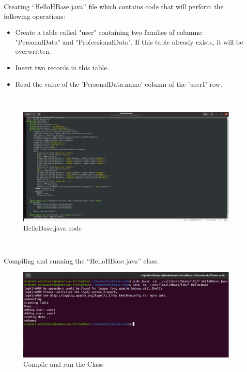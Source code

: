 \begin{spacing}{1.2}
\par Creating “HelloHBase.java” file which contains code that will perform the following operations:
\\
\begin{itemize}
  \item Create a table called "user" containing two families of columns: "PersonalData" and
"ProfessionalData". If this table already exists, it will be overwritten.
  \item Insert two records in this table.
  \item Read the value of the 'PersonalData:name' column of the 'user1' row.
\end{itemize}

\\
\begin{figure}[!htb] 
\begin{center} 
\includegraphics[width=1\linewidth]{Pictures/HBase/Using the HBase Java API/Configure the CLASSPATH in the .bashrc/HelloBase.java code} 
\end{center} 
\caption{HelloBase.java code} 
\end{figure}  \FloatBarrier
\\
\newpage
\par Compiling and running the “HelloHBase.java” class.
\\
\begin{figure}[!htb] 
\begin{center} 
\includegraphics[width=1\linewidth]{Pictures/HBase/Using the HBase Java API/Configure the CLASSPATH in the .bashrc/Compile and run the Class} 
\end{center} 
\caption{Compile and run the Class} 
\end{figure}  \FloatBarrier
\\


\end{spacing}
